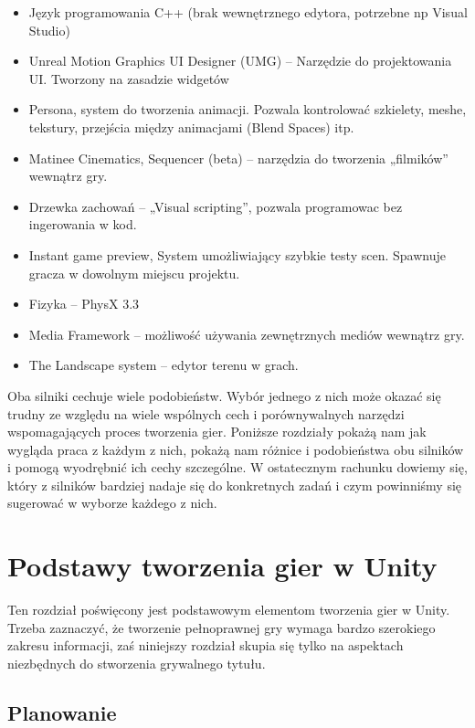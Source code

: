 \documentclass[brudnopis]{xmgr}
\begin{document}
	\begin{itemize}
	\item Język programowania C++ (brak wewnętrznego edytora, potrzebne np Visual Studio)
	\item Unreal Motion Graphics UI Designer (UMG) – Narzędzie do projektowania UI. Tworzony 	na zasadzie widgetów
	\item Persona, system do tworzenia animacji. Pozwala kontrolować szkielety, meshe, tekstury, 	 przejścia między animacjami (Blend Spaces) itp.
	\item Matinee Cinematics, Sequencer (beta)  – narzędzia do tworzenia „filmików” wewnątrz gry.
	\item Drzewka zachowań – „Visual scripting”, pozwala programowac bez ingerowania w kod.
	\item Instant game preview, System umożliwiający szybkie testy scen. Spawnuje gracza w dowolnym miejscu projektu.
	\item Fizyka – PhysX 3.3
	\item Media Framework – możliwość używania zewnętrznych mediów wewnątrz gry.
	\item The Landscape system – edytor terenu w grach.
	\end{itemize}

Oba silniki cechuje wiele podobieństw. Wybór jednego z nich może okazać się trudny ze względu na wiele wspólnych cech i porównywalnych narzędzi wspomagających proces tworzenia gier. Poniższe rozdziały pokażą nam jak wygląda praca z każdym z nich, pokażą nam różnice i podobieństwa obu silników i pomogą wyodrębnić ich cechy szczególne. W ostatecznym rachunku dowiemy się, który z silników bardziej nadaje się do konkretnych zadań i czym powinniśmy się sugerować w wyborze każdego z nich.

\chapter{Podstawy tworzenia gier w Unity}

Ten rozdział poświęcony jest podstawowym elementom tworzenia gier w Unity. Trzeba zaznaczyć, że tworzenie pełnoprawnej gry wymaga bardzo szerokiego zakresu informacji, zaś niniejszy rozdział skupia się tylko na aspektach niezbędnych do stworzenia grywalnego tytułu. 

\section{Planowanie} 
\end{document}
